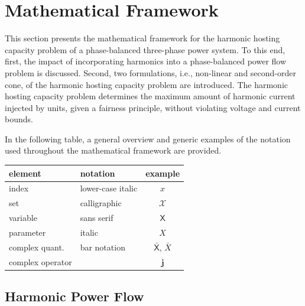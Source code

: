 \section{Mathematical Framework}
\label{sec:mathematical_framework}

This section presents the mathematical framework for the harmonic hosting capacity problem of a phase-balanced three-phase power system. To this end, first, the impact of incorporating harmonics into a phase-balanced power flow problem is discussed. Second, two formulations, i.e., non-linear and second-order cone, of the harmonic hosting capacity problem are introduced. The harmonic hosting capacity problem determines the maximum amount of harmonic current injected by units, given a fairness principle, without violating voltage and current bounds.

In the following table, a general overview and generic examples of the notation used throughout the mathematical framework are provided.
\begin{table}[ht!]
    \centering
    \begin{tabular}{ l l c }
        element         & notation                  & example                           \\ \hline
        index           & lower-case italic         & $x$                               \\
        set             & calligraphic              & $\mathcal{X}$                     \\ 
        variable        & sans serif                & $\mathsf{X}$                      \\
        parameter       & italic                    & $X$                               \\
        complex quant.  & bar notation              & $\bar{\mathsf{X}}$, $\bar{X}$     \\
        complex operator & & $\bm{j}$
    \end{tabular}
\end{table}

\vspace{-0.5cm}

\subsection{Harmonic Power Flow}
\label{sec:harmonic_power_flow}

